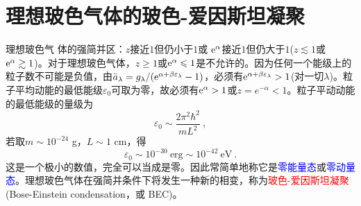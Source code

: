 \documentclass[12pt,a4paper]{article}
\begin{document}
\section{理想玻色气体的玻色-爱因斯坦凝聚}
理想玻色气 体的强简并区：$z$接近$1$但仍小于$1$或 ${\rm e}^\alpha$接近$1$但仍大于$1$($z \lesssim 1$或 ${\rm e}^\alpha \gtrsim 1$)。对于理想玻色气体，$z \geqslant 1$或${\rm e}^\alpha \leqslant 1$是不允许的。因为任何一个能级上的粒子数不可能是负值，由$\bar{a}_\lambda =g_\lambda/({\rm e}^{\alpha +\beta \varepsilon_\lambda}-1)$，必须有${\rm e}^{\alpha+\beta \varepsilon_\lambda}>1$(对一切$\lambda$)。粒子平均动能的最低能级$\varepsilon_0$可取为零，故必须有${\rm e}^{\alpha} > 1$或$z=e^{-\alpha}<1$。粒子平动动能的最低能级的量级为
\begin{equation*}
\varepsilon_0 \sim \dfrac{2\pi^2 \hbar^2}{mL^2} ~,
\end{equation*}
若取$m \sim 10^{-24}$ g，$L \sim 1$ cm，得
\begin{equation*}
\varepsilon_0 \sim 10^{-30} ~\text{erg} \sim 10^{-42} ~\text{eV} ~.
\end{equation*}
这是一个极小的数值，完全可以当成是零。因此常简单地称它是\textcolor{blue}{零能量态}或\textcolor{blue}{零动量态}。理想玻色气体在强简并条件下将发生一种新的相变，称为\textcolor{red}{玻色-爱因斯坦凝聚}(Bose-Einstein condensation，或 BEC)。
\end{document}
